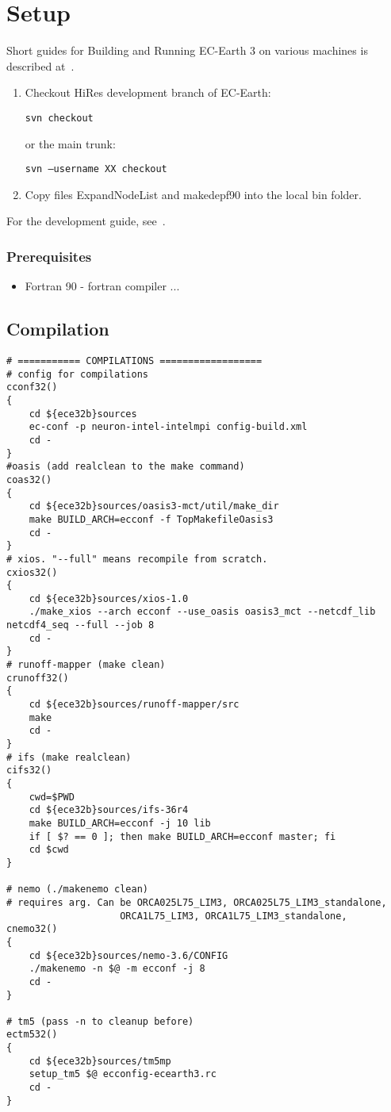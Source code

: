 
\chapter{Setup}
Short guides for Building and Running EC-Earth 3 on various machines is described at~\cite{br-wiki}.

\begin{enumerate}
    \item Checkout HiRes development branch of EC-Earth: 
    
    \texttt{svn checkout }
    
    or the main trunk:
    
    \texttt{svn --username XX checkout }
    
    \item Copy files ExpandNodeList and makedepf90 into the local bin folder.
\end{enumerate}
For the development guide, see~\cite{dev-guide}.

\subsection*{Prerequisites}
\begin{itemize}
    \item Fortran 90 - fortran compiler
    ...
\end{itemize}


\section{Compilation}

\begin{lstlisting}
# =========== COMPILATIONS ==================
# config for compilations
cconf32()
{
    cd ${ece32b}sources
    ec-conf -p neuron-intel-intelmpi config-build.xml
    cd -
}
#oasis (add realclean to the make command)
coas32()
{
    cd ${ece32b}sources/oasis3-mct/util/make_dir
    make BUILD_ARCH=ecconf -f TopMakefileOasis3
    cd -
}
# xios. "--full" means recompile from scratch.
cxios32()
{
    cd ${ece32b}sources/xios-1.0
    ./make_xios --arch ecconf --use_oasis oasis3_mct --netcdf_lib netcdf4_seq --full --job 8
    cd -
}
# runoff-mapper (make clean)
crunoff32()
{
    cd ${ece32b}sources/runoff-mapper/src
    make
    cd -
}
# ifs (make realclean)
cifs32()
{
    cwd=$PWD 
    cd ${ece32b}sources/ifs-36r4
    make BUILD_ARCH=ecconf -j 10 lib
    if [ $? == 0 ]; then make BUILD_ARCH=ecconf master; fi
    cd $cwd
}

# nemo (./makenemo clean)
# requires arg. Can be ORCA025L75_LIM3, ORCA025L75_LIM3_standalone, 
                    ORCA1L75_LIM3, ORCA1L75_LIM3_standalone,
cnemo32()
{
    cd ${ece32b}sources/nemo-3.6/CONFIG
    ./makenemo -n $@ -m ecconf -j 8
    cd -
} 

# tm5 (pass -n to cleanup before)
ectm532()
{
    cd ${ece32b}sources/tm5mp
    setup_tm5 $@ ecconfig-ecearth3.rc
    cd -
}
\end{lstlisting}

